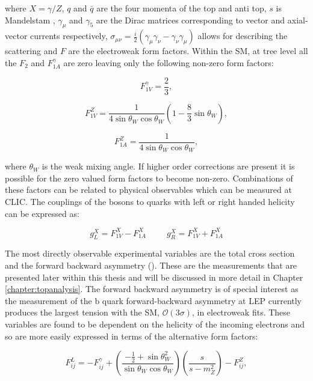 where $X=\gamma /Z$, $q$ and $\bar{q}$ are the four momenta of the top and anti top, $s$ is Mandelstam , $\gamma_\mu$ and $\gamma_5$ are the Dirac matrices corresponding to vector and axial-vector currents respectively, $\sigma_{\mu\nu}=\frac{i}{2}(\gamma_\mu \gamma_\nu -\gamma_\nu \gamma_\mu)$ allows for describing the scattering and $F$ are the electroweak form factors. Within the \ac{SM}, at tree level all the $F_2$ and $F_{1A}^{\gamma}$ are zero leaving only the following non-zero form factors:

\begin{equation}
F_{1V}^{\gamma}=\frac{2}{3},
\end{equation}

\begin{equation}
F_{1V}^{Z}=\frac{1}{4\sin\theta_{W}\cos\theta_{W}}(1-\frac{8}{3}\sin\theta_{W}),
\end{equation}

\begin{equation}
F_{1A}^{Z}=\frac{1}{4\sin\theta_{W}\cos\theta_{W}},
\end{equation}

where $\theta_W$ is the weak mixing angle. If higher order corrections are present it is possible for the zero valued form factors to become non-zero. Combinations of these factors can be related to physical observables which can be measured at CLIC. The couplings of the bosons to quarks with left or right handed helicity can be expressed as:

\begin{equation}
g_L^X = F_{1V}^{X} - F_{1A}^{X} ~~~~~~~~~~~ g_R^X = F_{1V}^{X} + F_{1A}^{X}
\end{equation}

The most directly observable experimental variables are the total cross section and the forward backward asymmetry (\afb). These are the measurements that are presented later within this thesis and will be discussed in more detail in Chapter \ref{chapter:topanalysis}. The forward backward asymmetry is of special interest as the measurement of the b quark forward-backward asymmetry at \ac{LEP}\cite{ABBIENDI200229} currently produces the largest tension with the \ac{SM}, $\mathcal{O}(3\sigma)$\cite{ALEPH:2005ab}, in electroweak fits. These variables are found to be dependent on the helicity of the incoming electrons \cite{Schmidt:1995mr} and so are more easily expressed in terms of the alternative form factors:

\begin{equation}
F_{ij}^{L} = -F_{ij}^{\gamma} +(\frac{-\frac{1}{2} +\sin\theta_W^2}{\sin\theta_W\cos\theta_W})(\frac{s}{s-m_Z^2}) -F_{ij}^{Z},
\end{equation}

